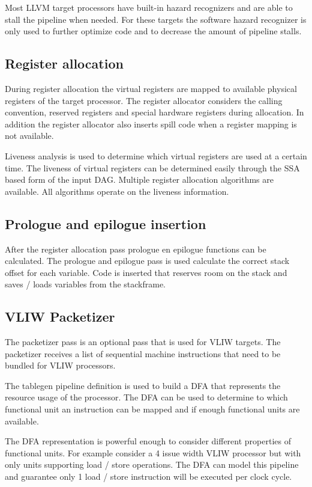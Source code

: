 Most LLVM target processors have built-in hazard recognizers and are able to stall the pipeline when needed. For these targets the software hazard recognizer is only used to further optimize code and to decrease the amount of pipeline stalls. 

\subsection{Register allocation}
During register allocation the virtual registers are mapped to available physical registers of the target processor. The register allocator considers the calling convention, reserved registers and special hardware registers during allocation. In addition the register allocator also inserts spill code when a register mapping is not available.

Liveness analysis is used to determine which virtual registers are used at a certain time. The liveness of virtual registers can be determined easily through the SSA based form of the input DAG. Multiple register allocation algorithms are available. All algorithms operate on the liveness information.

\subsection{Prologue and epilogue insertion}
After the register allocation pass prologue en epilogue functions can be calculated. The prologue and epilogue pass is used calculate the correct stack offset for each variable. Code is inserted that reserves room on the stack and saves / loads variables from the stackframe.

\subsection{VLIW Packetizer}
The packetizer pass is an optional pass that is used for VLIW targets. The packetizer receives a list of sequential machine instructions that need to be bundled for VLIW processors. 

The tablegen pipeline definition is used to build a DFA that represents the resource usage of the processor. The DFA can be used to determine to which functional unit an instruction can be mapped and if enough functional units are available.

The DFA representation is powerful enough to consider different properties of functional units. For example consider a 4 issue width VLIW processor but with only units supporting load / store operations. The DFA can model this pipeline and guarantee only 1 load / store instruction will be executed per clock cycle.

